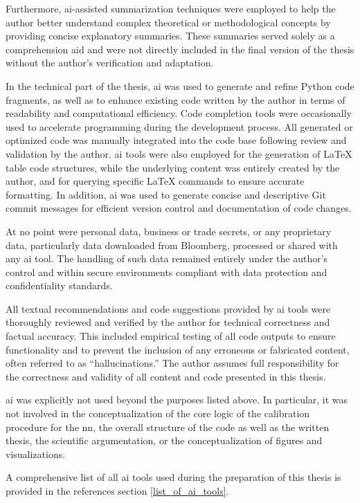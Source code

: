 Furthermore, \ac{ai}-assisted summarization techniques were employed to help the author better understand complex theoretical or methodological concepts by providing concise explanatory summaries. These summaries served solely as a comprehension aid and were not directly included in the final version of the thesis without the author's verification and adaptation.

In the technical part of the thesis, \ac{ai} was used to generate and refine Python code fragments, as well as to enhance existing code written by the author in terms of readability and computational efficiency. Code completion tools were occasionally used to accelerate programming during the development process. All generated or optimized code was manually integrated into the code base following review and validation by the author. \ac{ai} tools were also employed for the generation of LaTeX table code structures, while the underlying content was entirely created by the author, and for querying specific LaTeX commands to ensure accurate formatting. In addition, \ac{ai} was used to generate concise and descriptive Git commit messages for efficient version control and documentation of code changes.

At no point were personal data, business or trade secrets, or any proprietary data, particularly data downloaded from Bloomberg, processed or shared with any \ac{ai} tool. The handling of such data remained entirely under the author's control and within secure environments compliant with data protection and confidentiality standards.

All textual recommendations and code suggestions provided by \ac{ai} tools were thoroughly reviewed and verified by the author for technical correctness and factual accuracy. This included empirical testing of all code outputs to ensure functionality and to prevent the inclusion of any erroneous or fabricated content, often referred to as “hallucinations.” The author assumes full responsibility for the correctness and validity of all content and code presented in this thesis.

\ac{ai} was explicitly not used beyond the purposes listed above. In particular, it was not involved in the conceptualization of the core logic of the calibration procedure for the \ac{nn}, the overall structure of the code as well as the written thesis, the scientific argumentation, or the conceptualization of figures and visualizations.

A comprehensive list of all \ac{ai} tools used during the preparation of this thesis is provided in the references section \ref{list_of_ai_tools}.